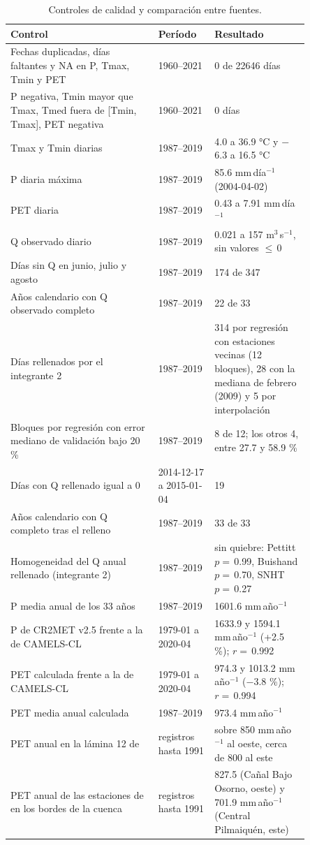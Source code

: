 \begin{table}[ht]
\centering
\caption{Controles de calidad y comparación entre fuentes.}
\label{tab:E02controles}
\begin{tabular}{|p{0.42\linewidth}|p{0.16\linewidth}|p{0.27\linewidth}|}
\hline
Control & Período & Resultado \\
\hline
Fechas duplicadas, días faltantes y NA en P, Tmax, Tmin y PET & 1960--2021 & 0 de 22646 días \\
\hline
P negativa, Tmin mayor que Tmax, Tmed fuera de [Tmin, Tmax], PET negativa & 1960--2021 & 0 días \\
\hline
Tmax y Tmin diarias & 1987--2019 & 4.0 a 36.9 °C y $-$6.3 a 16.5 °C \\
\hline
P diaria máxima & 1987--2019 & 85.6 mm\,día$^{-1}$ (2004-04-02) \\
\hline
PET diaria & 1987--2019 & 0.43 a 7.91 mm\,día$^{-1}$ \\
\hline
Q observado diario & 1987--2019 & 0.021 a 157 m$^3$\,s$^{-1}$, sin valores $\le$\,0 \\
\hline
Días sin Q en junio, julio y agosto & 1987--2019 & 174 de 347 \\
\hline
Años calendario con Q observado completo & 1987--2019 & 22 de 33 \\
\hline
Días rellenados por el integrante 2 & 1987--2019 & 314 por regresión con estaciones vecinas (12 bloques), 28 con la mediana de febrero (2009) y 5 por interpolación \\
\hline
Bloques por regresión con error mediano de validación bajo 20 \% & 1987--2019 & 8 de 12; los otros 4, entre 27.7 y 58.9 \% \\
\hline
Días con Q rellenado igual a 0 & 2014-12-17 a 2015-01-04 & 19 \\
\hline
Años calendario con Q completo tras el relleno & 1987--2019 & 33 de 33 \\
\hline
Homogeneidad del Q anual rellenado (integrante 2) & 1987--2019 & sin quiebre: Pettitt $p=$\,0.99, Buishand $p=$\,0.70, SNHT $p=$\,0.27 \\
\hline
P media anual de los 33 años & 1987--2019 & 1601.6 mm\,año$^{-1}$ \\
\hline
P de CR2MET v2.5 frente a la de CAMELS-CL \citep{AlvarezGarreton2018} & 1979-01 a 2020-04 & 1633.9 y 1594.1 mm\,año$^{-1}$ (+2.5 \%); $r=$\,0.992 \\
\hline
PET calculada frente a la de CAMELS-CL & 1979-01 a 2020-04 & 974.3 y 1013.2 mm\,año$^{-1}$ ($-$3.8 \%); $r=$\,0.994 \\
\hline
PET media anual calculada & 1987--2019 & 973.4 mm\,año$^{-1}$ \\
\hline
PET anual en la lámina 12 de \citet{Correa1997} & registros hasta 1991 & sobre 850 mm\,año$^{-1}$ al oeste, cerca de 800 al este \\
\hline
PET anual de las estaciones de \citet{Correa1997} en los bordes de la cuenca & registros hasta 1991 & 827.5 (Cañal Bajo Osorno, oeste) y 701.9 mm\,año$^{-1}$ (Central Pilmaiquén, este) \\
\hline
\end{tabular}
\end{table}

